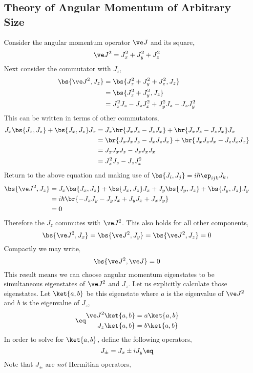 \documentclass{article}
\begin{document}
\subsection{Theory of Angular Momentum of Arbitrary Size}
Consider the angular momentum operator $\ve J$ and its square,
\[ \ve J^2 = J_x^2 + J_y^2 + J_z^2 \]
Next consider the commutator with $J_z$,
\begin{align*}
\bs{\ve J^2, J_z}
&= \bs{J_x^2 + J_y^2 + J_z^2, J_z} \\
&= \bs{J_x^2 + J_y^2, J_z} \\
&= J_x^2 J_z - J_z J_x^2 + J_y^2 J_z - J_z J_y^2
\end{align*}
This can be written in terms of other commutators,
\begin{align*}
    J_x \bs{J_x, J_z} + \bs{J_x, J_z} J_x
    &=  J_x \br{J_xJ_z - J_zJ_x} + \br{J_xJ_z - J_zJ_x} J_x  \\
    &=  \br{J_xJ_xJ_z - J_xJ_zJ_x} + \br{J_xJ_zJ_x - J_zJ_xJ_x}  \\
    &=  J_xJ_xJ_z - J_zJ_xJ_x  \\
    &=  J_x^2J_z - J_zJ_x^2
\end{align*}
Return to the above equation and making use of $\bs{J_i, J_j} = i\hbar \ep_{ijk} J_k$,
\begin{align*}
\bs{\ve J^2, J_z}
&= J_x\bs{J_x, J_z} + \bs{J_x, J_z}J_x + J_y\bs{J_y, J_z}+ \bs{J_y, J_z}J_y \\
&= i\hbar\br{-J_xJ_y - J_yJ_x + J_yJ_x+ J_xJ_y} \\
&= 0
\end{align*}
Therefore the $J_z$ commutes with $\ve J^2$. This also holds for all other components,
\[ \bs{\ve J^2, J_x} = \bs{\ve J^2, J_y} = \bs{\ve J^2, J_z} = 0 \]
Compactly we may write,
\[ \bs{\ve J^2, \ve J}= 0 \]
This result means we can choose angular momentum eigenstates to be simultaneous eigenstates of $\ve J^2$ and $J_z$. Let us explicitly calculate those eigenstates. Let $\ket{a,b}$ be this eigenstate where $a$ is the eigenvalue of $\ve J^2$ and $b$ is the eigenvalue of $J_z$,
\begin{align*}
    \eq\label{eq:rotation_system}
    \begin{split}
    \ve J^2 \ket{a,b} &= a \ket{a,b} \\
    J_z \ket{a,b} &= b \ket{a,b}
    \end{split}
\end{align*}
In order to solve for $\ket{a,b}$, define the following operators,
\[ J_{\pm} = J_x \pm i J_y \eq \label{eq:defjpjm}\]
Note that $J_{\pm}$ are \textit{not} Hermitian operators,
\end{document}
